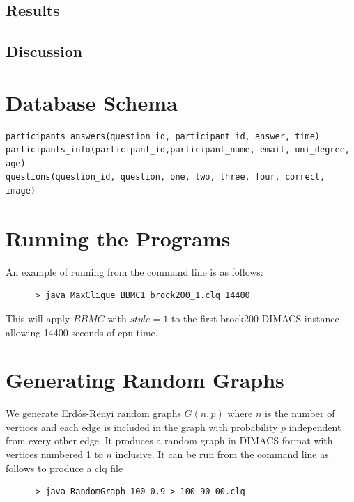 \documentclass{l4proj}
\begin{document}
\section{Results}

\section{Discussion}




\begin{appendices}

\chapter{Database Schema}

\begin{verbatim}
participants_answers(question_id, participant_id, answer, time)
participants_info(participant_id,participant_name, email, uni_degree, age)
questions(question_id, question, one, two, three, four, correct, image)
\end{verbatim}


\chapter{Running the Programs}
An example of running from the command line is as follows:
\begin{verbatim}
      > java MaxClique BBMC1 brock200_1.clq 14400
\end{verbatim}
This will apply $BBMC$ with $style = 1$ to the first brock200 DIMACS instance allowing 14400 seconds of cpu time.

\chapter{Generating Random Graphs}
\label{sec:randomGraph}
We generate Erd\'{o}s-R\"{e}nyi random graphs $G(n,p)$ where $n$ is the number of vertices and
each edge is included in the graph with probability $p$ independent from every other edge. It produces
a random graph in DIMACS format with vertices numbered 1 to $n$ inclusive. It can be run from the command line as follows to produce 
a clq file
\begin{verbatim}
      > java RandomGraph 100 0.9 > 100-90-00.clq
\end{verbatim}
\end{appendices}




\end{document}
